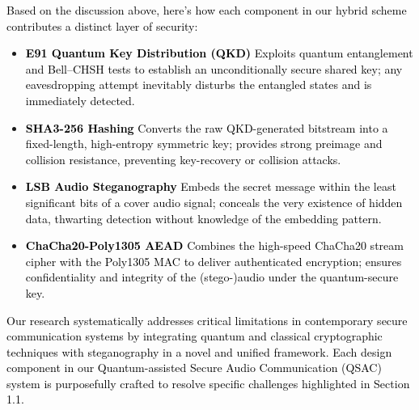 \documentclass[a4paper]{cas-sc}
\begin{document}
\textcolor{black}{Based on the discussion above, here's how each component in our hybrid scheme contributes a distinct layer of security:}
\begin{itemize}
    \item \textbf{\textcolor{black}{E91 Quantum Key Distribution (QKD)}}
          \textcolor{black}{Exploits quantum entanglement and Bell–CHSH tests to establish an unconditionally secure shared key; any eavesdropping attempt inevitably disturbs the entangled states and is immediately detected.}

    \item \textbf{\textcolor{black}{SHA3-256 Hashing}}
          \textcolor{black}{Converts the raw QKD-generated bitstream into a fixed-length, high-entropy symmetric key; provides strong preimage and collision resistance, preventing key-recovery or collision attacks.}

    \item \textbf{\textcolor{black}{LSB Audio Steganography}}
          \textcolor{black}{Embeds the secret message within the least significant bits of a cover audio signal; conceals the very existence of hidden data, thwarting detection without knowledge of the embedding pattern.}

    \item \textbf{\textcolor{black}{ChaCha20-Poly1305 AEAD}}
          \textcolor{black}{Combines the high-speed ChaCha20 stream cipher with the Poly1305 MAC to deliver authenticated encryption; ensures confidentiality and integrity of the (stego-)audio under the quantum-secure key.}
\end{itemize}
\textcolor{black}{Our research systematically addresses critical limitations in contemporary secure communication systems by integrating quantum and classical cryptographic techniques with steganography in a novel and unified framework. Each design component in our Quantum-assisted Secure Audio Communication (QSAC) system is purposefully crafted to resolve specific challenges highlighted in Section 1.1.}
\end{document}
